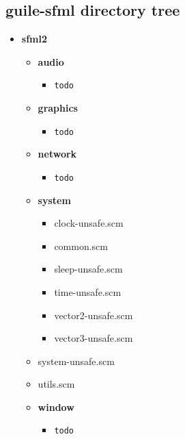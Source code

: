 \documentclass[latterpaper, leqno]{article}
\begin{document}
\subsection*{guile-sfml directory tree}
\begin{itemize}

\item \textbf{sfml2}
  \begin{itemize}

  \item \textbf{audio}
    \begin{itemize}
    \item \texttt{todo}
    \end{itemize}

  \item \textbf{graphics}
    \begin{itemize}
    \item \texttt{todo}
    \end{itemize}

  \item \textbf{network}
    \begin{itemize}
    \item \texttt{todo}
    \end{itemize}

  \item \textbf{system}
    \begin{itemize}
    \item clock-unsafe.scm
    \item common.scm
    \item sleep-unsafe.scm
    \item time-unsafe.scm
    \item vector2-unsafe.scm
    \item vector3-unsafe.scm
    \end{itemize}

  \item system-unsafe.scm

  \item utils.scm

  \item \textbf{window}
    \begin{itemize}
    \item \texttt{todo}
    \end{itemize}

  \end{itemize}

\end{itemize}
\end{document}
